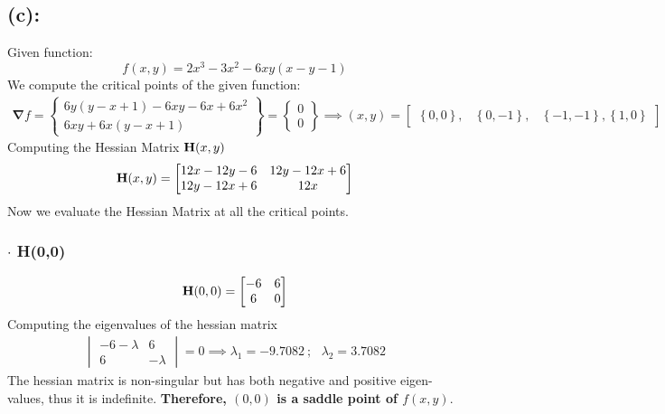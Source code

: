 \subsection*{(c): }
Given function:
\[
f(x,y)
=
2x^3 - 3x^2 - 6xy(x-y-1)
\]
We compute the critical points of the given function: 
\begin{align*}
\bm\nabla f
=
\begin{Bmatrix}
 6y(y - x + 1) - 6xy - 6x + 6x^2 \\
6xy + 6x(y - x + 1)
\end{Bmatrix}
=
\begin{Bmatrix}
0\\0
\end{Bmatrix}\implies (x,y) = \begin{bmatrix}
\left\{0,0 \right\}, & \left\{0,-1 \right\}, & \left\{-1,-1 \right\},\left\{1,0 \right\} 
\end{bmatrix}
\end{align*}
Computing the Hessian Matrix ${\bf H}(x,y)$
\begin{align*}
{\bf H}(x,y) = 
\begin{bmatrix}
12x-12y-6 & 12y-12x+6 \\
12y-12x+6 & 12x
\end{bmatrix}
\end{align*}
Now we evaluate the Hessian Matrix at all the critical points.
\subsubsection*{$\bm\cdot$ H(0,0)}
\begin{align*}
{\bf H} (0,0) =
\begin{bmatrix}
-6 & 6 \\
6 & 0
\end{bmatrix}
\end{align*}
Computing the eigenvalues of the hessian matrix
\begin{align*}
\begin{vmatrix}
-6-\lambda & 6 \\
6 & -\lambda
\end{vmatrix} = 0 \implies \lambda_1 = -9.7082\ ; \ \ \ \lambda_2 = 3.7082
\end{align*}
The hessian matrix is non-singular but has both negative and positive eigen-values, thus it is indefinite. {\bf Therefore, $(0,0)$ is a saddle point of $f(x,y)$}. 
